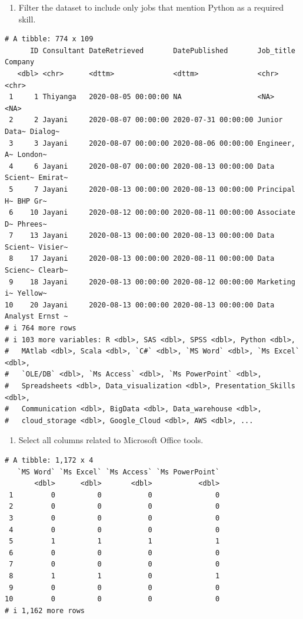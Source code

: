 \documentclass[
  letterpaper,
  DIV=11,
  numbers=noendperiod]{scrreprt}
\providecommand{\tightlist}{%
  \setlength{\itemsep}{0pt}\setlength{\parskip}{0pt}}\usepackage{longtable,booktabs,array}
\begin{document}
\begin{enumerate}
\def\labelenumi{\arabic{enumi}.}
\setcounter{enumi}{6}
\tightlist
\item
  Filter the dataset to include only jobs that mention Python as a
  required skill.
\end{enumerate}

\begin{verbatim}
# A tibble: 774 x 109
      ID Consultant DateRetrieved       DatePublished       Job_title    Company
   <dbl> <chr>      <dttm>              <dttm>              <chr>        <chr>  
 1     1 Thiyanga   2020-08-05 00:00:00 NA                  <NA>         <NA>   
 2     2 Jayani     2020-08-07 00:00:00 2020-07-31 00:00:00 Junior Data~ Dialog~
 3     3 Jayani     2020-08-07 00:00:00 2020-08-06 00:00:00 Engineer, A~ London~
 4     6 Jayani     2020-08-07 00:00:00 2020-08-13 00:00:00 Data Scient~ Emirat~
 5     7 Jayani     2020-08-13 00:00:00 2020-08-13 00:00:00 Principal H~ BHP Gr~
 6    10 Jayani     2020-08-12 00:00:00 2020-08-11 00:00:00 Associate D~ Phrees~
 7    13 Jayani     2020-08-13 00:00:00 2020-08-13 00:00:00 Data Scient~ Visier~
 8    17 Jayani     2020-08-13 00:00:00 2020-08-11 00:00:00 Data Scienc~ Clearb~
 9    18 Jayani     2020-08-13 00:00:00 2020-08-12 00:00:00 Marketing i~ Yellow~
10    20 Jayani     2020-08-13 00:00:00 2020-08-13 00:00:00 Data Analyst Ernst ~
# i 764 more rows
# i 103 more variables: R <dbl>, SAS <dbl>, SPSS <dbl>, Python <dbl>,
#   MAtlab <dbl>, Scala <dbl>, `C#` <dbl>, `MS Word` <dbl>, `Ms Excel` <dbl>,
#   `OLE/DB` <dbl>, `Ms Access` <dbl>, `Ms PowerPoint` <dbl>,
#   Spreadsheets <dbl>, Data_visualization <dbl>, Presentation_Skills <dbl>,
#   Communication <dbl>, BigData <dbl>, Data_warehouse <dbl>,
#   cloud_storage <dbl>, Google_Cloud <dbl>, AWS <dbl>, ...
\end{verbatim}

\begin{enumerate}
\def\labelenumi{\arabic{enumi}.}
\setcounter{enumi}{7}
\tightlist
\item
  Select all columns related to Microsoft Office tools.
\end{enumerate}

\begin{verbatim}
# A tibble: 1,172 x 4
   `MS Word` `Ms Excel` `Ms Access` `Ms PowerPoint`
       <dbl>      <dbl>       <dbl>           <dbl>
 1         0          0           0               0
 2         0          0           0               0
 3         0          0           0               0
 4         0          0           0               0
 5         1          1           1               1
 6         0          0           0               0
 7         0          0           0               0
 8         1          1           0               1
 9         0          0           0               0
10         0          0           0               0
# i 1,162 more rows
\end{verbatim}
\end{document}
